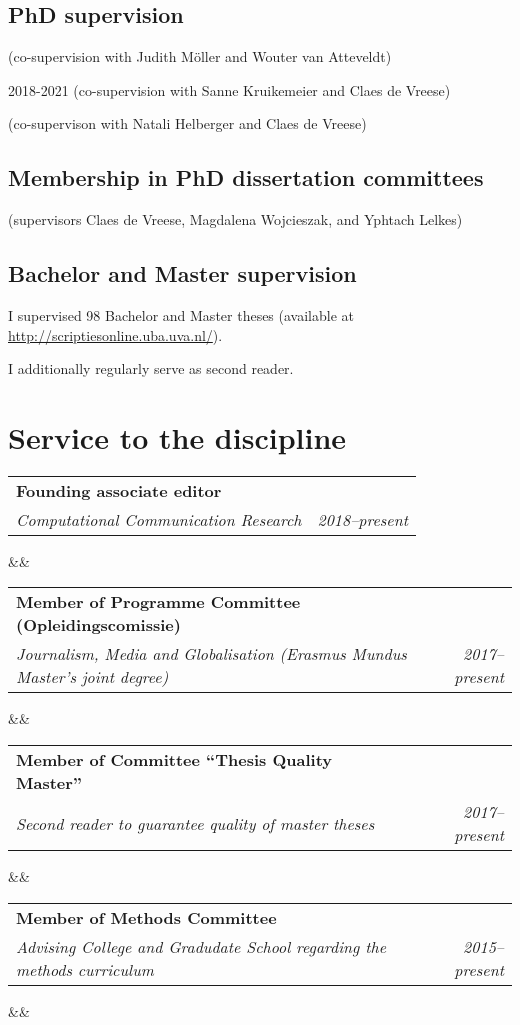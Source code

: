 \documentclass[11pt,a4paper,sans]{moderncv}
\makeatletter
\renewcommand*{\cventry}[7][.25em]{
	\begin{tabular*}{\textwidth}{p{13cm}@{\extracolsep{\fill}}r}%
		{\bfseries #4} & {\bfseries #5} \\%
		{\itshape #3\ifthenelse{\equal{#6}{}}{}{, #6}} & {\itshape #2}\\%
	\end{tabular*}%
	\ifx&#7&%
	\else{\\\vbox{\small#7}}\fi%
        \par\addvspace{#1}}
\makeatother
\begin{document}
\subsection{PhD supervision}
(co-supervision with Judith M\"oller and Wouter van Atteveldt) \newline

 {2018-2021}
(co-supervision with Sanne Kruikemeier and Claes de Vreese) \newline

(co-supervison with Natali Helberger and Claes de Vreese) \newline

\subsection{Membership in PhD dissertation committees}
(supervisors Claes de Vreese, Magdalena Wojcieszak, and Yphtach Lelkes) \newline

\subsection{Bachelor and Master supervision}
I supervised 98 Bachelor and Master theses (available at \url{http://scriptiesonline.uba.uva.nl/}). 

I additionally regularly serve as second reader.



\section{Service to the discipline}
\cventry{2018--present}{Computational Communication Research}{Founding associate editor}{}{}{}

\cventry{2017--present}{Journalism, Media and Globalisation (Erasmus Mundus Master's joint degree)}{Member of Programme Committee (Opleidingscomissie)}{}{}{}

\cventry{2017--present}{Second reader to guarantee quality of master theses}{Member of Committee ``Thesis Quality Master''}{}{}{}

\cventry{2015--present}{Advising College and Gradudate School regarding the methods curriculum}{Member of Methods Committee}{}{}{}
\end{document}
